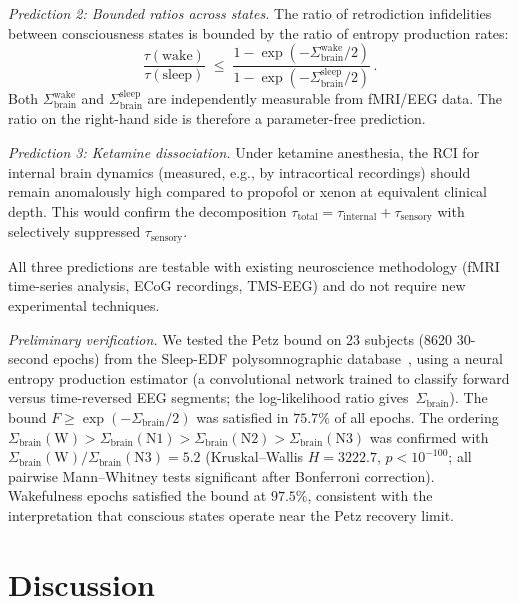 \documentclass[prl,twocolumn,superscriptaddress,longbibliography,floatfix]{revtex4-2}
\newcommand{\tauasym}{\tau}
\newcommand{\Sbrain}{\Sigma_{\mathrm{brain}}}
\begin{document}
\emph{Prediction 2: Bounded ratios across states.}
The ratio of retrodiction infidelities between consciousness states
is bounded by the ratio of entropy production rates:
\begin{equation}
\frac{\tauasym(\text{wake})}{\tauasym(\text{sleep})}
\;\leq\;
\frac{1-\exp(-\Sbrain^{\mathrm{wake}}/2)}
{1-\exp(-\Sbrain^{\mathrm{sleep}}/2)}\,.
\label{eq:ratio_bound}
\end{equation}
Both $\Sbrain^{\mathrm{wake}}$ and $\Sbrain^{\mathrm{sleep}}$ are
independently measurable from fMRI/EEG data.  The ratio on the
right-hand side is therefore a parameter-free prediction.

\emph{Prediction 3: Ketamine dissociation.}
Under ketamine anesthesia, the RCI for internal brain dynamics
(measured, e.g., by intracortical recordings) should remain
anomalously high compared to propofol or xenon at equivalent
clinical depth.  This would confirm the decomposition
$\tauasym_{\mathrm{total}} =
\tauasym_{\mathrm{internal}} + \tauasym_{\mathrm{sensory}}$
with selectively suppressed $\tauasym_{\mathrm{sensory}}$.

All three predictions are testable with existing neuroscience
methodology (fMRI time-series analysis, ECoG recordings, TMS-EEG)
and do not require new experimental techniques.

\emph{Preliminary verification.}
We tested the Petz bound on 23 subjects (8620 30-second epochs)
from the Sleep-EDF polysomnographic database~\cite{SleepEDF},
using a neural entropy production estimator (a convolutional network
trained to classify forward versus time-reversed EEG segments;
the log-likelihood ratio gives~$\Sbrain$).
The bound $F \geq \exp(-\Sbrain/2)$ was satisfied in $75.7\%$
of all epochs.
The ordering
$\Sbrain(\mathrm{W}) > \Sbrain(\mathrm{N1})
> \Sbrain(\mathrm{N2}) > \Sbrain(\mathrm{N3})$
was confirmed with
$\Sbrain(\mathrm{W})/\Sbrain(\mathrm{N3}) = 5.2$
(Kruskal--Wallis $H = 3222.7$, $p < 10^{-100}$;
all pairwise Mann--Whitney tests significant after
Bonferroni correction).
Wakefulness epochs satisfied the bound at $97.5\%$,
consistent with the interpretation that conscious states
operate near the Petz recovery limit.


\section{Discussion}
\label{sec:discussion}
\end{document}
